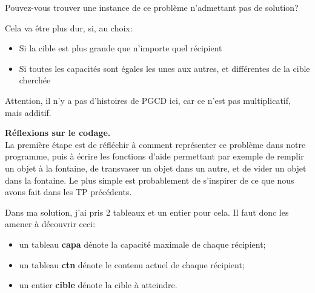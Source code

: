 \documentclass[10pt]{article}\usepackage[correction,nu]{esial}%
\begin{document}
\Question Pouvez-vous trouver une instance de ce problème n'admettant pas de
solution?
\begin{Reponse}
  \noindent
  Cela va être plus dur, si, au choix:
  \begin{itemize}
  \item Si la cible est plus grande que n'importe quel récipient
  \item Si toutes les capacités sont égales les unes aux autres, et différentes
    de la cible cherchée
  \end{itemize}
  Attention, il n'y a pas d'histoires de PGCD ici, car ce n'est pas
  multiplicatif, mais additif.
\end{Reponse}

\Exercice\textbf{Réflexions sur le codage.}\\
La première étape est de réfléchir à comment représenter ce problème dans notre
programme, puis à écrire les fonctions d'aide permettant par exemple de remplir
un objet à la fontaine, de transvaser un objet dans un autre, et de vider un
objet dans la fontaine. Le plus simple est probablement de s'inspirer de ce que
nous avons fait dans les TP précédents.

\begin{Reponse}
  Dans ma solution, j'ai pris 2 tableaux et un entier pour cela. Il faut donc
  les amener à découvrir ceci:
  \begin{itemize}
  \item un tableau \textbf{capa} dénote la capacité maximale de chaque récipient;
  \item un tableau \textbf{ctn} dénote le contenu actuel de chaque récipient;
  \item un entier \textbf{cible} dénote la cible à atteindre.
  \end{itemize}

  \newcommand*\FancyVerbStartString{// BEGIN HELPERS}
  \newcommand*\FancyVerbStopString{// END HELPERS}

\end{Reponse}


\end{document}
